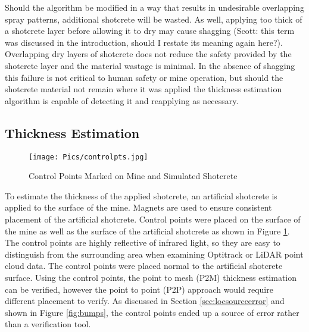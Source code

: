 Should the algorithm be modified in a way that results in undesirable overlapping spray patterns, additional shotcrete will be wasted. As well, applying too thick of a shotcrete layer before allowing it to dry may cause shagging (Scott: this term was discussed in the introduction, should I restate its meaning again here?). Overlapping dry layers of shotcrete does not reduce the safety provided by the shotcrete layer and the material wastage is minimal. In the absence of shagging this failure is not critical to human safety or mine operation, but should the shotcrete material not remain where it was applied the thickness estimation algorithm is capable of detecting it and reapplying as necessary.\\

\subsection{Thickness Estimation}

\begin{figure}
    \centering
    \texttt{[image: Pics/controlpts.jpg]}
    \caption{Control Points Marked on Mine and Simulated Shotcrete}
    \label{fig:controlpts}
\end{figure}

To estimate the thickness of the applied shotcrete, an artificial shotcrete is applied to the surface of the mine. Magnets are used to ensure consistent placement of the artificial shotcrete. Control points were placed on the surface of the mine as well as the surface of the artificial shotcrete as shown in Figure \ref{fig:controlpts}. The control points are highly reflective of infrared light, so they are easy to distinguish from the surrounding area when examining Optitrack or LiDAR point cloud data. The control points were placed normal to the artificial shotcrete surface. Using the control points, the point to mesh (P2M) thickness estimation can be verified, however the point to point (P2P) approach would require different placement to verify. As discussed in Section \ref{sec:locsourceerror} and shown in Figure \ref{fig:bumps}, the control points ended up a source of error rather than a verification tool.\\

